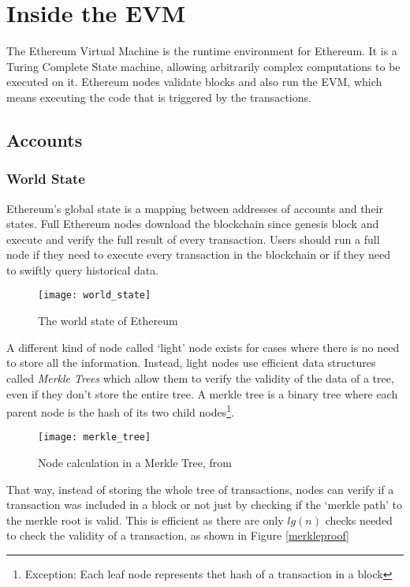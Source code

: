 \section{Inside the EVM}
The Ethereum Virtual Machine is the runtime environment for Ethereum. It is a Turing Complete State machine, allowing arbitrarily complex computations to be executed on it. Ethereum nodes validate blocks and also run the EVM, which means executing the code that is triggered by the transactions. \subsection{Accounts}

\subsubsection{World State}
Ethereum's global state is a mapping between addresses of accounts and their states. Full Ethereum nodes download the blockchain since genesis block and execute and verify the full result of every transaction. Users should run a full node if they need to execute every transaction in the blockchain or if they need to swiftly query historical data. 

\begin{figure}[H]
    \centering
    \texttt{[image: world\_state]}
    \caption{The world state of Ethereum}
    \label{worldstate}
\end{figure}

A different kind of node called `light' node exists for cases where there is no need to store all the information. Instead, light nodes use efficient data structures called \textit{Merkle Trees} which allow them to verify the validity of the data of a tree, even if they don't store the entire tree. A merkle tree is a binary tree where each parent node is the hash of its two child nodes\footnote{Exception: Each leaf node represents thet hash of a transaction in a block}. 

\begin{figure}[H]
    \centering
    \texttt{[image: merkle\_tree]}
    \caption{Node calculation in a Merkle Tree, from \cite{smartproperty}}
    \label{merkletree}
\end{figure}

That way, instead of storing the whole tree of transactions, nodes can verify if a transaction was included in a block or not just by checking if the `merkle path' to the merkle root is valid. This is efficient as there are only $lg(n)$ checks needed to check the validity of a transaction, as shown in Figure \ref{merkleproof}


